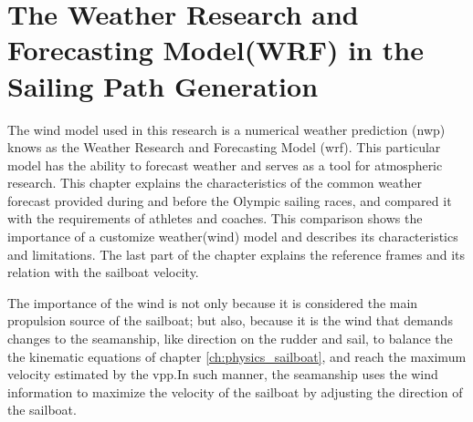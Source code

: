 
\chapter{The Weather Research and Forecasting Model(WRF) in the Sailing Path Generation} \label{ch:weatherModel} %

The wind model used in this research is a numerical weather prediction (\acrshort{nwp}) knows as the Weather Research and Forecasting Model (\acrshort{wrf}). This particular model has the ability to forecast weather and serves as a tool for atmospheric research.  
This chapter explains the characteristics of the common weather forecast provided during and before the Olympic sailing races, and compared it with the requirements of athletes and coaches. This comparison shows the importance of a customize weather(wind) model and describes its characteristics and limitations. The last part of the chapter explains the reference frames and its relation with %
the sailboat velocity.\par

The importance of the wind is not only because it is considered the main propulsion source of the sailboat; but also, because it is the wind that demands changes to the seamanship, like direction on the rudder and sail, to balance the the kinematic equations of chapter \ref{ch:physics_sailboat}, and reach the maximum velocity  estimated by the \acrshort{vpp}.In such manner, the seamanship uses the wind information to maximize the velocity of the sailboat by adjusting the direction of the sailboat. \par 

